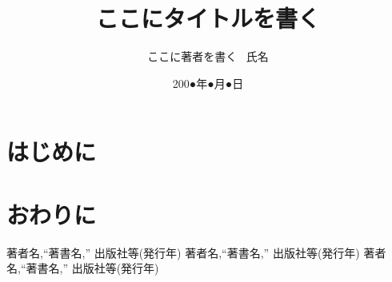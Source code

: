 \documentclass[a4j,twocolumn,fleqn]{jarticle}
\title{\bf ここにタイトルを書く}
\author{ここに著者を書く \  氏名}
\date{200●年●月●日}
\begin{document}
\pagestyle{plain}
\maketitle

\section{はじめに}


\section{おわりに}


{\small
 \begin{thebibliography}{99} %
   著者名,``著書名,''
	  出版社等(発行年)
   著者名,``著書名,''
	  出版社等(発行年)
   著者名,``著書名,''
	  出版社等(発行年)
 \end{thebibliography}
}
\end{document}
